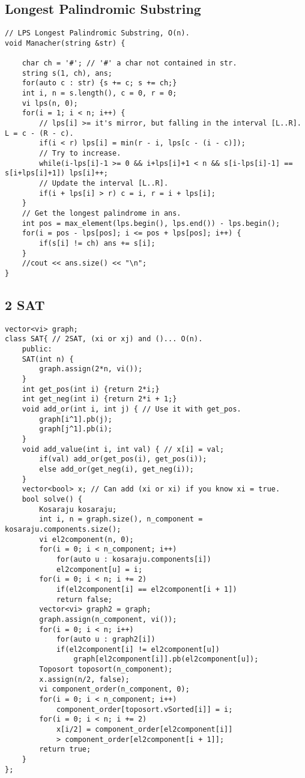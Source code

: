 \documentclass[a4paper]{article}
\begin{document}
\subsection*{Longest Palindromic Substring}
\begin{verbatim}
// LPS Longest Palindromic Substring, O(n).
void Manacher(string &str) {

    char ch = '#'; // '#' a char not contained in str.
    string s(1, ch), ans;
    for(auto c : str) {s += c; s += ch;}
    int i, n = s.length(), c = 0, r = 0;
    vi lps(n, 0);
    for(i = 1; i < n; i++) {
        // lps[i] >= it's mirror, but falling in the interval [L..R]. L = c - (R - c).
        if(i < r) lps[i] = min(r - i, lps[c - (i - c)]);
        // Try to increase.
        while(i-lps[i]-1 >= 0 && i+lps[i]+1 < n && s[i-lps[i]-1] == s[i+lps[i]+1]) lps[i]++;
        // Update the interval [L..R].
        if(i + lps[i] > r) c = i, r = i + lps[i];
    }
    // Get the longest palindrome in ans.
    int pos = max_element(lps.begin(), lps.end()) - lps.begin();
    for(i = pos - lps[pos]; i <= pos + lps[pos]; i++) {
        if(s[i] != ch) ans += s[i];
    }
    //cout << ans.size() << "\n";
}
\end{verbatim}
\subsection*{2 SAT}
\begin{multicols}{2}
\begin{verbatim}
vector<vi> graph;
class SAT{ // 2SAT, (xi or xj) and ()... O(n).
    public:
    SAT(int n) {
        graph.assign(2*n, vi());
    }
    int get_pos(int i) {return 2*i;}
    int get_neg(int i) {return 2*i + 1;}
    void add_or(int i, int j) { // Use it with get_pos.
        graph[i^1].pb(j);
        graph[j^1].pb(i);
    }
    void add_value(int i, int val) { // x[i] = val;
        if(val) add_or(get_pos(i), get_pos(i));
        else add_or(get_neg(i), get_neg(i));
    }
    vector<bool> x; // Can add (xi or xi) if you know xi = true.
    bool solve() {
        Kosaraju kosaraju;
        int i, n = graph.size(), n_component = kosaraju.components.size();
        vi el2component(n, 0);
        for(i = 0; i < n_component; i++)
            for(auto u : kosaraju.components[i])
            el2component[u] = i;
        for(i = 0; i < n; i += 2)
            if(el2component[i] == el2component[i + 1]) 
            return false;
        vector<vi> graph2 = graph;
        graph.assign(n_component, vi());
        for(i = 0; i < n; i++) 
            for(auto u : graph2[i]) 
            if(el2component[i] != el2component[u])
                graph[el2component[i]].pb(el2component[u]);
        Toposort toposort(n_component);
        x.assign(n/2, false);
        vi component_order(n_component, 0);
        for(i = 0; i < n_component; i++)
            component_order[toposort.vSorted[i]] = i;
        for(i = 0; i < n; i += 2)
            x[i/2] = component_order[el2component[i]] 
            > component_order[el2component[i + 1]];
        return true;
    }
};
\end{verbatim}
\end{multicols}
\end{document}

